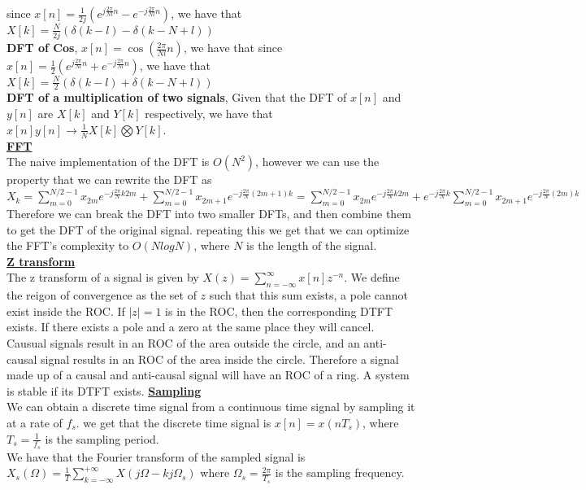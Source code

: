 \documentclass[9pt]{article}
\begin{document}
since $x[n]=\frac{1}{2j}\left(e^{j\frac{2\pi}{Nl}n}-e^{-j\frac{2\pi}{Nl}n}\right)$, we have that
$X[k]=\frac{N}{2j}\left(\delta(k-l)-\delta(k-N+l)\right)$\\
\textbf{DFT of Cos}, $x[n]=\cos(\frac{2\pi}{Nl}n)$, we have that
since $x[n]=\frac{1}{2}\left(e^{j\frac{2\pi}{Nl}n}+e^{-j\frac{2\pi}{Nl}n}\right)$, we have that
$X[k]=\frac{N}{2}\left(\delta(k-l)+\delta(k-N+l)\right)$\\
\textbf{DFT of a multiplication of two signals}, Given that 
the DFT of $x[n]$ and $y[n]$ are $X[k]$ and $Y[k]$ respectively, we have that
$x[n]y[n]\to \frac{1}{N} X[k]\bigotimes Y[k]$.\\
\underline{\textbf{FFT}}\\
The naive implementation of the DFT is $O(N^2)$, however we can use the
property that we can rewrite the DFT as 
$X_k=\sum_{m=0}^{N/2-1}x_{2m}e^{-j\frac{2\pi}{N}k2m}+\sum_{m=0}^{N/2-1}x_{2m+1}e^{-j\frac{2\pi}{N}(2m+1)k}
=\sum_{m=0}^{N/2-1}x_{2m}e^{-j\frac{2\pi}{N}k2m}+e^{-j\frac{2\pi}{N}k}\sum_{m=0}^{N/2-1}x_{2m+1}e^{-j\frac{2\pi}{N}(2m)k}$
Therefore we can break the DFT into two smaller DFTs, and then combine them to get the DFT of the original signal.
repeating this we get that we can optimize the FFT's complexity to 
$O(NlogN)$, where $N$ is the length of the signal.\\
\underline{\textbf{Z transform}}\\
The z transform of a signal is given by $X(z)=\sum_{n=-\infty}^{\infty}x[n]z^{-n}$. We define the 
reigon of convergence as the set of $z$ such that this sum exists, a pole 
cannot exist inside the ROC. If $|z|=1$
is in the ROC, then the corresponding DTFT exists. If there exists 
a pole and a zero at the same place they will cancel. Causual signals
result in an ROC of the area outside the circle, and an anti-causal signal
results in an ROC of the area inside the circle. Therefore a signal 
made up of a causal and anti-causal signal will have an ROC of a ring. A system
is stable if its DTFT exists.
\underline{\textbf{Sampling}}\\
We can obtain a discrete time signal from a continuous time signal by sampling it at a rate of $f_s$.
we get that the discrete time signal is $x[n]=x(nT_s)$, where $T_s=\frac{1}{f_s}$ is the sampling period.\\
We have that the Fourier transform of the sampled signal is 
$X_{s}(\Omega)=\frac{1}{T}\sum_{k=-\infty}^{+\infty}X(j\Omega-kj\Omega_s)$
where $\Omega_s=\frac{2\pi}{T_s}$ is the sampling frequency.\\
\end{document}
